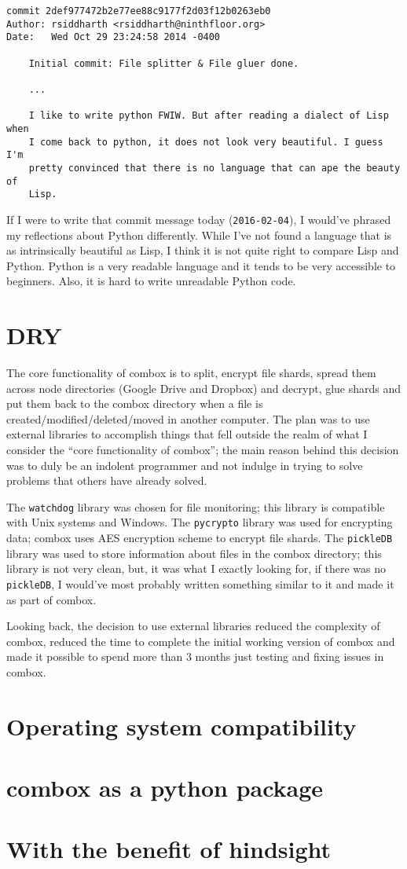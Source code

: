 \begin{verbatim}
commit 2def977472b2e77ee88c9177f2d03f12b0263eb0
Author: rsiddharth <rsiddharth@ninthfloor.org>
Date:   Wed Oct 29 23:24:58 2014 -0400

    Initial commit: File splitter & File gluer done.

    ...

    I like to write python FWIW. But after reading a dialect of Lisp when
    I come back to python, it does not look very beautiful. I guess I'm
    pretty convinced that there is no language that can ape the beauty of
    Lisp.
\end{verbatim}

If I were to write that commit message today (\verb+2016-02-04+), I
would've phrased my reflections about Python differently. While I've
not found a language that is as intrinsically beautiful as Lisp, I
think it is not quite right to compare Lisp and Python. Python is a
very readable language and it tends to be very accessible to
beginners. Also, it is hard to write unreadable Python code.

\section{DRY}

The core functionality of combox is to split, encrypt file shards,
spread them across node directories (Google Drive and Dropbox) and
decrypt, glue shards and put them back to the combox directory when a
file is created/modified/deleted/moved in another computer. The plan
was to use external libraries to accomplish things that fell outside
the realm of what I consider the ``core functionality of combox''; the
main reason behind this decision was to duly be an indolent programmer
and not indulge in trying to solve problems that others have already
solved.

The \verb+watchdog+\cite{pylib:watchdog} library was chosen for file
monitoring; this library is compatible with Unix systems and
Windows. The \verb+pycrypto+ library\cite{pylib:pycrypto} was used for
encrypting data; combox uses AES encryption scheme to encrypt file
shards. The \verb+pickleDB+\cite{pylib:pickledb} library was used to
store information about files in the combox directory; this library is
not very clean, but, it was what I exactly looking for, if there was
no \verb+pickleDB+, I would've most probably written something similar
to it and made it as part of combox.

Looking back, the decision to use external libraries reduced the
complexity of combox, reduced the time to complete the initial working
version of combox and made it possible to spend more than 3 months
just testing and fixing issues in combox.

\section{Operating system compatibility}\label{4-os-compat}

\section{combox as a python package}

\section{With the benefit of hindsight}